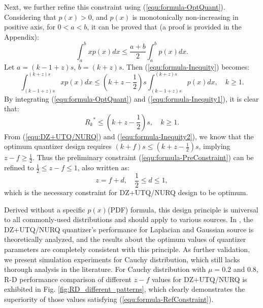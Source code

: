 \documentclass[smallabstract,smallcaptions]{dccpaper}
\begin{document}
Next, we further refine this constraint using (\ref{equ:formula-OptQuant}). Considering that $p(x) > 0$, and $p(x)$ is monotonically non-increasing in positive axis, for $0 < a < b$, it can be proved that (a proof is provided in the Appendix):
\begin{equation}\label{equ:formula-Inequity}
	\int_a^b xp(x)dx \le \frac{a+b}{2} \int_a^b p(x)dx.
\end{equation}
Let $a=(k-1+z)s$, $b=(k+z)s$. Then (\ref{equ:formula-Inequity}) becomes:
\begin{equation}\label{equ:formula-Inequity1}
	\int_{(k-1+z)s}^{(k+z)s} xp(x)dx \le (k+z-\frac{1}{2}) s \int_{(k-1+z)s}^{(k+z)s} p(x)dx, \quad k \ge 1.
\end{equation}
By integrating (\ref{equ:formula-OptQuant}) and (\ref{equ:formula-Inequity1}), it is clear that:
\begin{equation}\label{equ:formula-Inequity2}
	{R_k}^* \le (k+z-\frac{1}{2})s, \quad k \ge 1.
\end{equation}
From (\ref{equ:DZ+UTQ/NURQ}) and (\ref{equ:formula-Inequity2}), we know that the optimum quantizer design requires $(k+f)s \le (k+z-\frac{1}{2})s$, implying $z-f \ge \frac{1}{2}$. Thus the preliminary constraint (\ref{equ:formula-PreConstraint}) can be refined to $\frac{1}{2} \le z-f \le 1$, also written as:
\begin{equation}\label{equ:formula-RefConstraint}
	z = f+d, \quad \frac{1}{2} \le d \le 1,
\end{equation}
which is the necessary constraint for DZ+UTQ/NURQ design to be optimum.

Derived without a specific $p(x)$(PDF) formula, this design principle is universal to all commonly-used distributions and should apply to various sources. In \cite{Sullivan_VCIP2005}, the DZ+UTQ/NURQ quantizer's performance for Laplacian and Gaussian source is theoretically analyzed, and the results about the optimum values of quantizer parameters are completely consistent with this principle. As further validation, we present simulation experiments for Cauchy distribution, which still lacks thorough analysis in the literature. For Cauchy distribution with $\mu = 0.2$ and $0.8$, R-D performance comparison of different $z-f$ values for DZ+UTQ/NURQ is exhibited in Fig. \ref{fig:RD_different_patterns}, which clearly demonstrates the superiority of those values satisfying (\ref{equ:formula-RefConstraint}).
\end{document}
